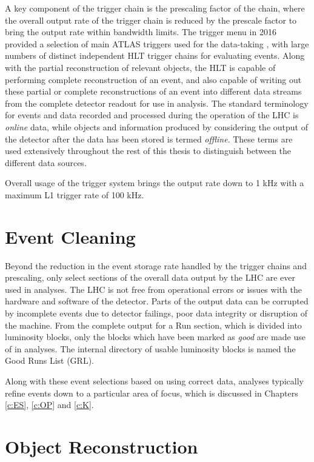 	A key component of the trigger chain is the prescaling factor of the chain, where the overall output rate of the trigger chain is reduced by the prescale factor to bring the output rate within bandwidth limits. The trigger menu in 2016 provided a selection of main ATLAS triggers used for the data-taking \cite{triggermenu}, with large numbers of distinct independent HLT trigger chains for evaluating events. Along with the partial reconstruction of relevant objects, the HLT is capable of performing complete reconstruction of an event, and also capable of writing out these partial or complete reconstructions of an event into different data streams from the complete detector readout for use in analysis. The standard terminology for events and data recorded and processed during the operation of the LHC is \textit{online} data, while objects and information produced by considering the output of the detector after the data has been stored is termed \textit{offline}. These terms are used extensively throughout the rest of this thesis to distinguish between the different data sources.

	Overall usage of the trigger system brings the output rate down to 1 kHz with a maximum L1 trigger rate of 100 kHz.

\section{Event Cleaning}

	Beyond the reduction in the event storage rate handled by the trigger chains and prescaling, only select sections of the overall data output by the LHC are ever used in analyses. The LHC is not free from operational errors or issues with the hardware and software of the detector. Parts of the output data can be corrupted by incomplete events due to detector failings, poor data integrity or disruption of the machine. From the complete output for a Run section, which is divided into luminosity blocks, only the blocks which have been marked as \textit{good} are made use of in analyses. The internal directory of usable luminosity blocks is named the Good Runs List (GRL).

	Along with these event selections based on using correct data, analyses typically refine events down to a particular area of focus, which is discussed in Chapters \ref{c:ES}, \ref{c:OP} and \ref{c:K}.

\section{Object Reconstruction}

